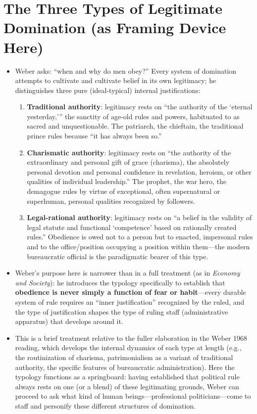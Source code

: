 \documentclass[12pt]{article}
\begin{document}
\section{The Three Types of Legitimate Domination (as Framing Device Here)}

\begin{itemize}[leftmargin=*, itemsep=4pt]
    \item Weber asks: ``when and why do men obey?'' Every system of domination attempts to cultivate and cultivate belief in its own legitimacy; he distinguishes three pure (ideal-typical) internal justifications:
    \begin{enumerate}
        \item \textbf{Traditional authority}: legitimacy rests on ``the authority of the `eternal yesterday,''' the sanctity of age-old rules and powers, habituated to as sacred and unquestionable. The patriarch, the chieftain, the traditional prince rules because ``it has always been so.''
        \item \textbf{Charismatic authority}: legitimacy rests on ``the authority of the extraordinary and personal gift of grace (charisma), the absolutely personal devotion and personal confidence in revelation, heroism, or other qualities of individual leadership.'' The prophet, the war hero, the demagogue rules by virtue of exceptional, often supernatural or superhuman, personal qualities recognized by followers.
        \item \textbf{Legal-rational authority}: legitimacy rests on ``a belief in the validity of legal statute and functional `competence' based on rationally created rules.'' Obedience is owed not to a person but to enacted, impersonal rules and to the office/position occupying a position within them---the modern bureaucratic official is the paradigmatic bearer of this type.
    \end{enumerate}
    \item Weber's purpose here is narrower than in a full treatment (as in \textit{Economy and Society}): he introduces the typology specifically to establish that \textbf{obedience is never simply a function of fear or habit}---every durable system of rule requires an ``inner justification'' recognized by the ruled, and the type of justification shapes the type of ruling staff (administrative apparatus) that develops around it.
    \item This is a brief treatment relative to the fuller elaboration in the Weber 1968 reading, which develops the internal dynamics of each type at length (e.g., the routinization of charisma, patrimonialism as a variant of traditional authority, the specific features of bureaucratic administration). Here the typology functions as a springboard: having established that political rule always rests on one (or a blend) of these legitimating grounds, Weber can proceed to ask what kind of human beings---professional politicians---come to staff and personify these different structures of domination.

\end{itemize}
\end{document}
